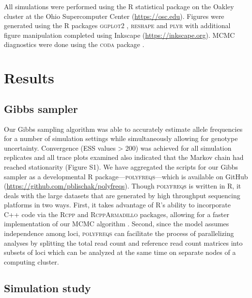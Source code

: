 \documentclass[11pt,english,letterpaper,oneside]{article}
\begin{document}
All simulations were performed using the R statistical package \citep{r2014} on the Oakley cluster at the Ohio Supercomputer Center (\url{https://osc.edu}). Figures were generated using the R packages \textsc{ggplot2} \citep{wickham2009ggplot2}, \textsc{reshape} \citep{wickham2011plyr} and \textsc{plyr} \citep{wickham2007reshape} with additional figure manipulation completed using Inkscape (\url{https://inkscape.org}). MCMC diagnostics were done using the \textsc{coda} package \citep{plummer2006coda}.
\medskip

\section*{Results}         %

\subsection*{Gibbs sampler}
\medskip

Our Gibbs sampling algorithm was able to accurately estimate allele frequencies for a number of simulation settings while simultaneously allowing for genotype uncertainty. Convergence (ESS values > 200) was achieved for all simulation replicates and all trace plots examined also indicated that the Markov chain had reached stationarity (Figure S1). We have aggregated the scripts for our Gibbs sampler as a developmental R package---\textsc{polyfreqs}---which is available on GitHub (\url{https://github.com/pblischak/polyfreqs}). Though \textsc{polyfreqs} is written in R, it deals with the large datasets that are generated by high throughput sequencing platforms in two ways. First, it takes advantage of R's ability to incorporate C++ code via the \textsc{Rcpp} and \textsc{RcppArmadillo} packages, allowing for a faster implementation of our MCMC algorithm \citep{eddelbuettel2011rcpp,eddelbuettel2013rcppBook,eddelbuettel2014rcpparmadillo}. Second, since the model assumes independence among loci, \textsc{polyfreqs} can facilitate the process of parallelizing analyses by splitting the total read count and reference read count matrices into subsets of loci which can be analyzed at the same time on separate nodes of a computing cluster.

\medskip
\subsection*{Simulation study}
\medskip
\end{document}
